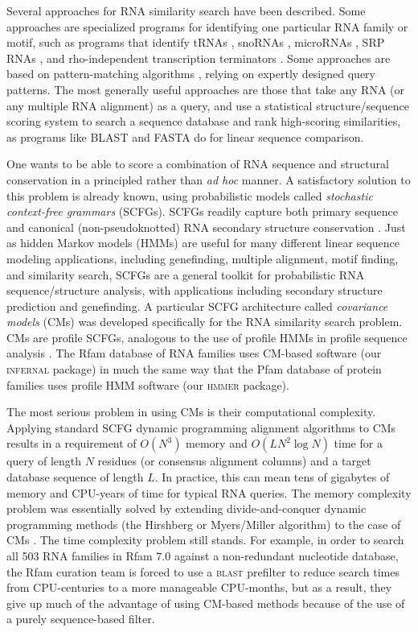\documentclass[11pt]{article}
\begin{document}
Several approaches for RNA similarity search have been described. Some
approaches are specialized programs for identifying one particular RNA
family or motif, such as programs that identify tRNAs
\cite{LoweEddy97}, snoRNAs \cite{LoweEddy99}, microRNAs \cite{Lai03,
Lim03}, SRP RNAs \cite{Regalia02}, and rho-independent transcription
terminators \cite{Ermolaeva00}. Some approaches are based on
pattern-matching algorithms \cite{Macke01,Gautheret01}, relying on
expertly designed query patterns. The most generally useful approaches
are those that take any RNA (or any multiple RNA alignment) as a
query, and use a statistical structure/sequence scoring system to
search a sequence database and rank high-scoring similarities, as
programs like BLAST and FASTA do for linear sequence comparison.

One wants to be able to score a combination of RNA sequence and
structural conservation in a principled rather than \emph{ad hoc}
manner. A satisfactory solution to this problem is already known,
using probabilistic models called \emph{stochastic context-free
grammars} (SCFGs). SCFGs readily capture both primary sequence and
canonical (non-pseudoknotted) RNA secondary structure conservation
\cite{Sakakibara94c,Durbin98}. Just as hidden Markov models (HMMs) are
useful for many different linear sequence modeling applications,
including genefinding, multiple alignment, motif finding, and
similarity search, SCFGs are a general toolkit for probabilistic RNA
sequence/structure analysis, with applications including secondary
structure prediction and genefinding. A particular SCFG architecture
called \emph{covariance models} (CMs) was developed specifically for
the RNA similarity search problem. CMs are profile SCFGs, analogous to
the use of profile HMMs in profile sequence analysis
\cite{Eddy94,Eddy02b}.  The Rfam database of RNA families
\cite{Griffiths-Jones05} uses CM-based software (our \textsc{infernal}
package) in much the same way that the Pfam database of protein
families uses profile HMM software (our \textsc{hmmer} package).

The most serious problem in using CMs is their computational
complexity. Applying standard SCFG dynamic programming alignment
algorithms to CMs results in a requirement of $O(N^3)$ memory and $O(L
N^2 \log N)$ time for a query of length $N$ residues (or consensus
alignment columns) and a target database sequence of length $L$.  In
practice, this can mean tens of gigabytes of memory and CPU-years of
time for typical RNA queries. The memory complexity problem was
essentially solved by extending divide-and-conquer dynamic programming
methods (the Hirshberg or Myers/Miller algorithm) to the case of CMs
\cite{Eddy02b}. The time complexity problem still stands.  For
example, in order to search all 503 RNA families in Rfam 7.0 against a
non-redundant nucleotide database, the Rfam curation team is forced to
use a \textsc{blast} prefilter to reduce search times from
CPU-centuries to a more manageable CPU-months, but as a result, they
give up much of the advantage of using CM-based methods because of the
use of a purely sequence-based filter.
\end{document}
